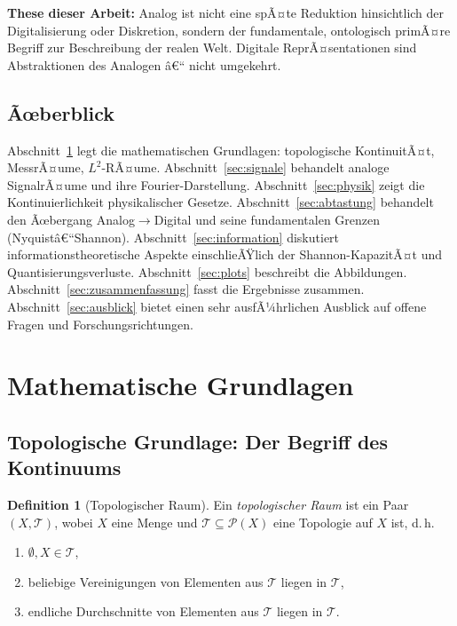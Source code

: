 ﻿\documentclass[a4paper,12pt]{article}
\theoremstyle{definition}
\newtheorem{definition}{Definition}
\begin{document}
\textbf{These dieser Arbeit:} Analog ist nicht eine spÃ¤te Reduktion hinsichtlich der
Digitalisierung oder Diskretion, sondern der fundamentale, ontologisch primÃ¤re Begriff
zur Beschreibung der realen Welt.  Digitale ReprÃ¤sentationen sind Abstraktionen des
Analogen â€“ nicht umgekehrt.

\subsection{Ãœberblick}

Abschnitt~\ref{sec:grundlagen} legt die mathematischen Grundlagen:
topologische KontinuitÃ¤t, MessrÃ¤ume, $L^2$-RÃ¤ume.
Abschnitt~\ref{sec:signale} behandelt analoge SignalrÃ¤ume und ihre
Fourier-Darstellung.
Abschnitt~\ref{sec:physik} zeigt die Kontinuierlichkeit physikalischer Gesetze.
Abschnitt~\ref{sec:abtastung} behandelt den Ãœbergang Analog$\to$Digital und
seine fundamentalen Grenzen (Nyquistâ€“Shannon).
Abschnitt~\ref{sec:information} diskutiert informationstheoretische Aspekte
einschlieÃŸlich der Shannon-KapazitÃ¤t und Quantisierungsverluste.
Abschnitt~\ref{sec:plots} beschreibt die Abbildungen.
Abschnitt~\ref{sec:zusammenfassung} fasst die Ergebnisse zusammen.
Abschnitt~\ref{sec:ausblick} bietet einen sehr ausfÃ¼hrlichen Ausblick auf
offene Fragen und Forschungsrichtungen.

\section{Mathematische Grundlagen}
\label{sec:grundlagen}

\subsection{Topologische Grundlage: Der Begriff des Kontinuums}

\begin{definition}[Topologischer Raum]
Ein \emph{topologischer Raum} ist ein Paar $(X, \mathcal{T})$, wobei $X$ eine Menge
und $\mathcal{T} \subseteq \mathcal{P}(X)$ eine Topologie auf $X$ ist, d.\,h.
\begin{enumerate}
    \item $\emptyset, X \in \mathcal{T}$,
    \item beliebige Vereinigungen von Elementen aus $\mathcal{T}$ liegen in $\mathcal{T}$,
    \item endliche Durchschnitte von Elementen aus $\mathcal{T}$ liegen in $\mathcal{T}$.
\end{enumerate}
\end{definition}
\end{document}
